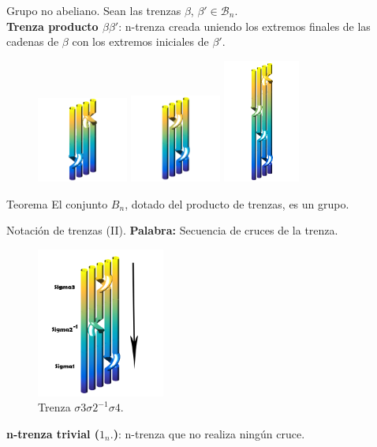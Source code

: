 \documentclass{beamer}
\begin{document}
\begin{frame}{Grupo no abeliano.}
	Sean las trenzas $\beta$, $\beta' \in \mathscr{B}_{n}$.\\
	\textbf{Trenza producto $\beta \beta'$}: n-trenza creada uniendo los extremos finales de las cadenas de $\beta$ con los extremos iniciales de $\beta'$.\\
	\begin{figure}[h!]
		\includegraphics[width=3cm]{imagenes/1c1.png}
		\includegraphics[width=3cm]{imagenes/1c2.png}
		\includegraphics[width=2.5cm]{imagenes/1c3.png} 
	\end{figure}
	\begin{alertblock}{Teorema}
		El conjunto ${B}_{n}$, dotado del producto de trenzas, es un grupo.
	\end{alertblock}
\end{frame}

\begin{frame}{Notación de trenzas (II).}
	\textbf{Palabra:} Secuencia de cruces de la trenza.
		\begin{figure}[h!]
			\includegraphics[width=4.2cm]{imagenes/t7.png}
			\caption{Trenza $\sigma3\sigma2^{-1}\sigma4$.}
		\end{figure}
	\textbf{\textbf{n-trenza trivial} ($1_{n}.$)}: n-trenza que no realiza ningún cruce.\\
\end{frame}
\end{document}
